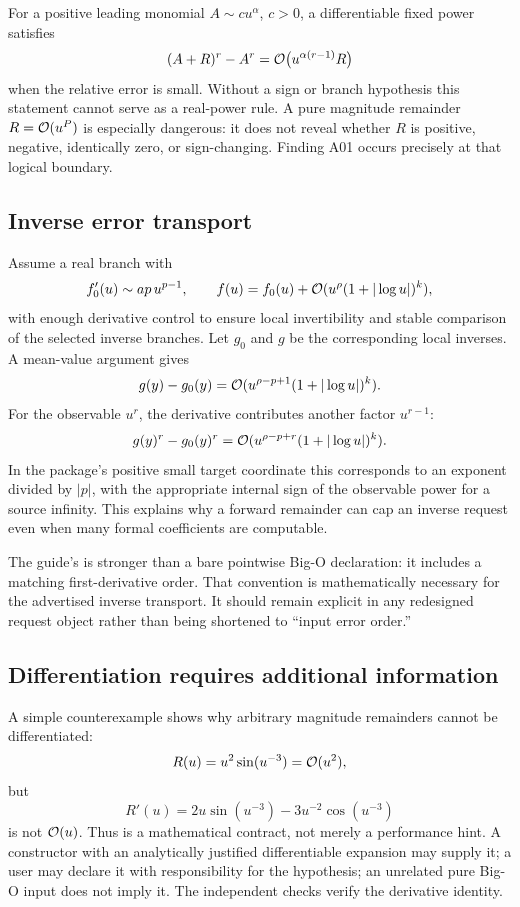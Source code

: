 For a positive leading monomial $A\sim c u^\alpha$, $c>0$, a differentiable fixed power satisfies
\[
 (A+R)^r-A^r=\mathcal O\bigl(u^{\alpha(r-1)}R\bigr)
\]
when the relative error is small. Without a sign or branch hypothesis this statement cannot serve as a real-power rule. A pure magnitude remainder $R=\mathcal O(u^P)$ is especially dangerous: it does not reveal whether $R$ is positive, negative, identically zero, or sign-changing. Finding A01 occurs precisely at that logical boundary.

\subsection{Inverse error transport}
Assume a real branch with
\[
 f_0'(u)\sim ap\,u^{p-1},\qquad
 f(u)=f_0(u)+\mathcal O(u^\rho(1+|\log u|)^k),
\]
with enough derivative control to ensure local invertibility and stable comparison of the selected inverse branches. Let $g_0$ and $g$ be the corresponding local inverses. A mean-value argument gives
\begin{equation}\label{eq:inverseerror}
 g(y)-g_0(y)=\mathcal O(u^{\rho-p+1}(1+|\log u|)^k).
\end{equation}
For the observable $u^r$, the derivative contributes another factor $u^{r-1}$:
\begin{equation}\label{eq:observableerror}
 g(y)^r-g_0(y)^r=\mathcal O(u^{\rho-p+r}(1+|\log u|)^k).
\end{equation}
In the package's positive small target coordinate this corresponds to an exponent divided by $|p|$, with the appropriate internal sign of the observable power for a source infinity. This explains why a forward remainder can cap an inverse request even when many formal coefficients are computable.\cite{core,guide}

The guide's  is stronger than a bare pointwise Big-O declaration: it includes a matching first-derivative order. That convention is mathematically necessary for the advertised inverse transport. It should remain explicit in any redesigned request object rather than being shortened to ``input error order.''\cite{guide}

\subsection{Differentiation requires additional information}
A simple counterexample shows why arbitrary magnitude remainders cannot be differentiated:
\[
 R(u)=u^2\sin(u^{-3})=\mathcal O(u^2),
\]
but
\[
 R'(u)=2u\sin(u^{-3})-3u^{-2}\cos(u^{-3})
\]
is not $\mathcal O(u)$. Thus  is a mathematical contract, not merely a performance hint. A constructor with an analytically justified differentiable expansion may supply it; a user may declare it with responsibility for the hypothesis; an unrelated pure Big-O input does not imply it. The independent checks verify the derivative identity.\cite{operations,guide}

